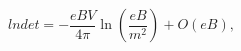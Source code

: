 \begin{equation}
\label{Eq_0505}
lndet = - \frac{eBV}{4\pi} \ln\left(\frac{eB}{m^2}\right) + O(eB),
\end{equation}

